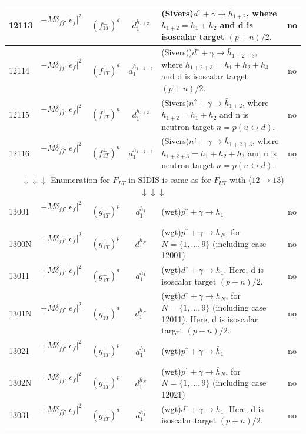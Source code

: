 \documentclass[prd,nofootinbib,eqsecnum,final]{revtex4}
\renewcommand{\(}{\left(}
\renewcommand{\)}{\right)}
\renewcommand{\[}{\left[}
\renewcommand{\]}{\right]}
\begin{document}
\begin{center}
\begin{longtable}{||l|p{6cm}|c|c||p{7cm}|c||}
\\\hline
12113 & $-M\delta_{f\bar f'}|e_f|^2$~~&$(f_{1T}^\perp)^{d}$ & $d^{h_{1+2}}_1$ & (Sivers)$d^{\uparrow}+\gamma\to \bar h_{1+2}$, where $h_{1+2}=h_1+h_2$ and d is isoscalar target $(p+n)/2$. & no
\\\hline
12114 & $-M\delta_{f\bar f'}|e_f|^2$~~&$(f_{1T}^\perp)^{d}$ & $d^{h_{1+2+3}}_1$ & (Sivers))$d^{\uparrow}+\gamma\to \bar h_{1+2+3}$, where $h_{1+2+3}=h_1+h_2+h_3$ and d is isoscalar target $(p+n)/2$. & no
\\\hline
12115 & $-M\delta_{f\bar f'}|e_f|^2$~~&$(f_{1T}^\perp)^{n}$ & $d^{h_{1+2}}_1$ & (Sivers)$n^{\uparrow}+\gamma\to \bar h_{1+2}$, where $h_{1+2}=h_1+h_2$ and n is neutron target $n=p(u\leftrightarrow d)$. & no
\\\hline
12116 & $-M\delta_{f\bar f'}|e_f|^2$~~&$(f_{1T}^\perp)^{n}$ & $d^{h_{1+2+3}}_1$ & (Sivers)$n^{\uparrow}+\gamma\to \bar h_{1+2+3}$, where $h_{1+2+3}=h_1+h_2+h_3$ and n is neutron target $n=p(u\leftrightarrow d)$. & no
\\\hline \hline
\multicolumn{6}{||c||}{$\downarrow\downarrow\downarrow$ Enumeration for $F_{LT}$ in SIDIS is same as for $F_{UT}$ with ($12\to 13$) $\downarrow\downarrow\downarrow$}
\\\hline \hline
13001 & $+M\delta_{ff'}|e_f|^2$~~&$(g_{1T}^\perp)^p$ & $d^{h_1}_1$ & (wgt)$p^{\uparrow}+\gamma\to h_1$ & no
\\\hline
1300N & $+M\delta_{ff'}|e_f|^2$~~&$(g_{1T}^\perp)^p$ & $d^{h_N}_1$ & (wgt)$p^{\uparrow}+\gamma\to h_N$, for $N=\{1,...,9\}$ (including case 12001) & no
\\\hline \hline
13011 & $+M\delta_{ff'}|e_f|^2$~~&$(g_{1T}^\perp)^{d}$ & $d^{h_1}_1$ & (wgt)$d^{\uparrow}+\gamma\to h_1$. Here, d is isoscalar target $(p+n)/2$. & no
\\\hline
1301N & $+M\delta_{ff'}|e_f|^2$~~&$(g_{1T}^\perp)^{d}$ & $d^{h_N}_1$ & (wgt)$d^{\uparrow}+\gamma\to h_N$, for $N=\{1,...,9\}$ (including case 12011). Here, d is isoscalar target $(p+n)/2$. & no
\\\hline \hline
13021 & $+M\delta_{f\bar f'}|e_f|^2$~~&$(g_{1T}^\perp)^p$ & $d^{\bar h_1}_1$ & (wgt)$p^{\uparrow}+\gamma\to \bar h_1$ & no
\\\hline
1302N & $+M\delta_{f\bar f'}|e_f|^2$~~&$(g_{1T}^\perp)^p$ & $d^{\bar h_N}_1$ & (wgt)$p^{\uparrow}+\gamma\to \bar h_N$, for $N=\{1,...,9\}$ (including case 12021) & no
\\\hline \hline
13031 & $+M\delta_{f\bar f'}|e_f|^2$~~&$(g_{1T}^\perp)^{d}$ & $d^{\bar h_1}_1$ & (wgt)$d^{\uparrow}+\gamma\to \bar h_1$. Here, d is isoscalar target $(p+n)/2$. & no

\end{longtable}
\end{center}
\end{document}
